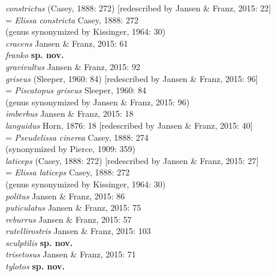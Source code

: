 \documentclass[fleqn,10pt,lineno]{wlpeerj} %
\begin{document}
\begin{tabbing}
			\> \textit{constrictus} (Casey, 1888: 272) [redescribed by Jansen \& Franz, 2015: 22]\\
				\> \> = \textit{Elissa constricta} Casey, 1888: 272\\
				\> \> \> (genus synonymized by Kissinger, 1964: 30)\\
			\> \textit{cracens} Jansen \& Franz, 2015: 61\\
			\> \textit{franko} \textbf{sp. nov.}\\
			\> \textit{gravivultus} Jansen \& Franz, 2015: 92\\
			\> \textit{griseus} (Sleeper, 1960: 84) [redescribed by Jansen \& Franz, 2015: 96]\\
				\> \> = \textit{Piscatopus griseus} Sleeper, 1960: 84\\
				\> \> \> (genus synonymized by Jansen \& Franz, 2015: 96)\\
			\> \textit{imberbus} Jansen \& Franz, 2015: 18\\
			\> \textit{languidus} Horn, 1876: 18 [redescribed by Jansen \& Franz, 2015: 40]\\
				\> \> = \textit{Pseudelissa cinerea} Casey, 1888: 274\\
				\> \> \> (synonymized by Pierce, 1909: 359)\\
			\> \textit{laticeps} (Casey, 1888: 272) [redescribed by Jansen \& Franz, 2015: 27]\\
				\> \> = \textit{Elissa laticeps} Casey, 1888: 272\\
				\> \> \> (genus synonymized by Kissinger, 1964: 30)\\
			\> \textit{politus} Jansen \& Franz, 2015: 86\\
			\> \textit{puticulatus} Jansen \& Franz, 2015: 75\\
			\> \textit{reburrus} Jansen \& Franz, 2015: 57\\
			\> \textit{rutellirostris} Jansen \& Franz, 2015: 103\\
			\> \textit{sculptilis} \textbf{sp. nov.}\\
			\> \textit{trisetosus} Jansen \& Franz, 2015: 71\\
			\> \textit{tylotos} \textbf{sp. nov.}\\
	\end{tabbing}
	
\end{document}
